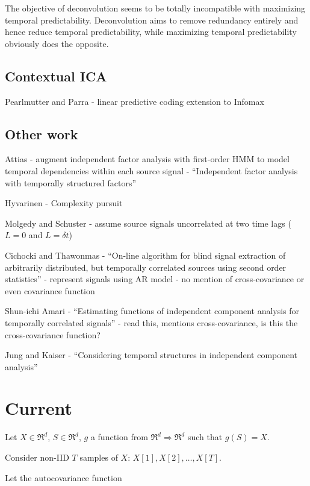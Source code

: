 \documentclass{article}
\begin{document}
  The objective of deconvolution seems to be totally incompatible with maximizing temporal predictability. Deconvolution aims to remove redundancy entirely and hence reduce temporal predictability, while maximizing temporal predictability obviously does the opposite.
  
  \subsection{Contextual ICA}
  Pearlmutter and Parra - linear predictive coding extension to Infomax
  
  \subsection{Other work}

  Attias - augment independent factor analysis with first-order HMM to model temporal dependencies within each source signal - ``Independent factor analysis with temporally structured factors''
  
  Hyvarinen - Complexity pursuit
  
  Molgedy and Schuster - assume source signals uncorrelated at two time lags ($L=0$ and $L=\delta t$)
  
  Cichocki and Thawonmas - ``On-line algorithm for blind signal extraction of arbitrarily distributed, but temporally correlated sources using second order statistics'' - represent signals using AR model - no mention of cross-covariance or even covariance function
  
  Shun-ichi Amari - ``Estimating functions of independent component analysis for temporally correlated signals'' - read this, mentions cross-covariance, is this the cross-covariance function?
  
  Jung and Kaiser - ``Considering temporal structures in independent component analysis''
  
  \section{Current}
  
  Let $X \in \mathfrak{R}^d$, $S \in \mathfrak{R}^d$, $g$ a function from $\mathfrak{R}^d \Rightarrow \mathfrak{R}^d$ such that $g(S) = X$.
  
  Consider non-IID $T$ samples of $X$: $X[1], X[2], \ldots, X[T]$.
  
  Let the autocovariance function

  
  
  
  
\end{document}
